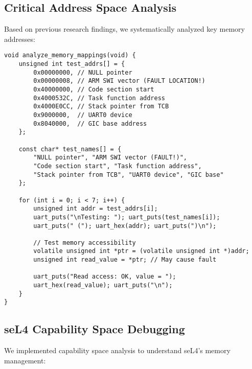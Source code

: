\documentclass[11pt,a4paper]{article}
\begin{document}
\subsection{Critical Address Space Analysis}

Based on previous research findings, we systematically analyzed key memory addresses:

\begin{lstlisting}[caption={Critical Address Testing Framework}]
void analyze_memory_mappings(void) {
    unsigned int test_addrs[] = {
        0x00000000, // NULL pointer
        0x00000008, // ARM SWI vector (FAULT LOCATION!)
        0x40000000, // Code section start
        0x4000532C, // Task function address
        0x4000E0CC, // Stack pointer from TCB
        0x9000000,  // UART0 device
        0x8040000,  // GIC base address
    };
    
    const char* test_names[] = {
        "NULL pointer", "ARM SWI vector (FAULT!)", 
        "Code section start", "Task function address",
        "Stack pointer from TCB", "UART0 device", "GIC base"
    };
    
    for (int i = 0; i < 7; i++) {
        unsigned int addr = test_addrs[i];
        uart_puts("\nTesting: "); uart_puts(test_names[i]);
        uart_puts(" ("); uart_hex(addr); uart_puts(")\n");
        
        // Test memory accessibility
        volatile unsigned int *ptr = (volatile unsigned int *)addr;
        unsigned int read_value = *ptr; // May cause fault
        
        uart_puts("Read access: OK, value = "); 
        uart_hex(read_value); uart_puts("\n");
    }
}
\end{lstlisting}

\subsection{seL4 Capability Space Debugging}

We implemented capability space analysis to understand seL4's memory management:
\end{document}
